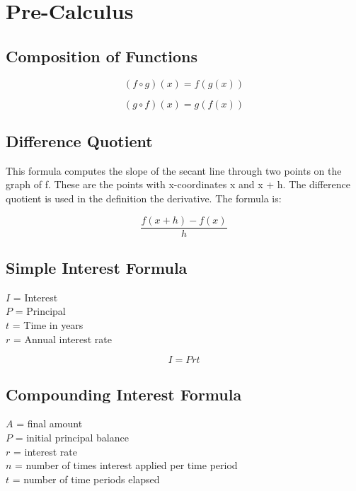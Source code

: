 \chapter{Pre-Calculus}

\section{Composition of Functions}
\begin{minipage}{0.4\textwidth}
  \begin{equation*}
    (f \circ g)(x) = f(g(x))
  \end{equation*}

  \begin{equation*}
    (g \circ f)(x) = g(f(x))
  \end{equation*}
\vspace{0.5cm}
\end{minipage}


\section{Difference Quotient}

\noindent This formula computes the slope of the secant line through two points 
on the graph of f. These are the points with x-coordinates x and x + h. The 
difference quotient is used in the definition the derivative. The formula is:

\begin{equation*}
  \frac{f(x+h)-f(x)}{h}
\end{equation*}


\section{Simple Interest Formula}

\noindent $I$ = Interest\\
$P$ = Principal\\
$t$ = Time in years\\
$r$ = Annual interest rate

\begin{equation*}
  I=Prt
\end{equation*}


\section{Compounding Interest Formula}

\noindent $A$ = final amount\\
$P$ = initial principal balance\\
$r$ = interest rate\\
$n$ = number of times interest applied per time period\\
$t$ = number of time periods elapsed

